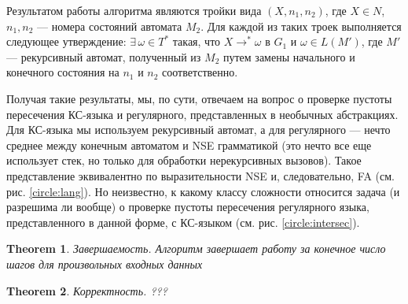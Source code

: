 \documentclass[14pt]{matmex-diploma-custom}
\newtheorem{theorem}{Theorem}
\begin{document}
Результатом работы алгоритма являются тройки вида $(X, n_1, n_2)$, где $X \in N$, $n_1, n_2$ --- номера состояний автомата $M_2$. 
Для каждой из таких троек выполняется следующее утверждение: $\exists \, \omega \in T^*$ такая, что $X \rightarrow^* \omega$ в $G_1$ и $\omega \in L(M')$, где $M'$ --- рекурсивный автомат, полученный из $M_2$ путем замены начального и конечного состояния на $n_1$ и $n_2$ соответственно.
	
Получая такие результаты, мы, по сути, отвечаем на вопрос о проверке пустоты пересечения КС-языка и регулярного, представленных в необычных абстракциях. 
Для КС-языка мы используем рекурсивный автомат, а для регулярного --- нечто среднее между конечным автоматом и NSE грамматикой (это нечто все еще использует стек, но только для обработки нерекурсивных вызовов). 
Такое представление эквивалентно по выразительности NSE и, следовательно, FA (см. рис. \ref{circle:lang}). 
Но неизвестно, к какому классу сложности относится задача (и разрешима ли вообще) о проверке пустоты пересечения регулярного языка, представленного в данной форме, с КС-языком (см. рис. \ref{circle:intersec}).
	
\begin{theorem}{Завершаемость.}
	Алгоритм завершает работу за конечное число шагов для произвольных входных данных
\end{theorem}
	
\begin{theorem}{Корректность.}
	???
\end{theorem}
\end{document}
